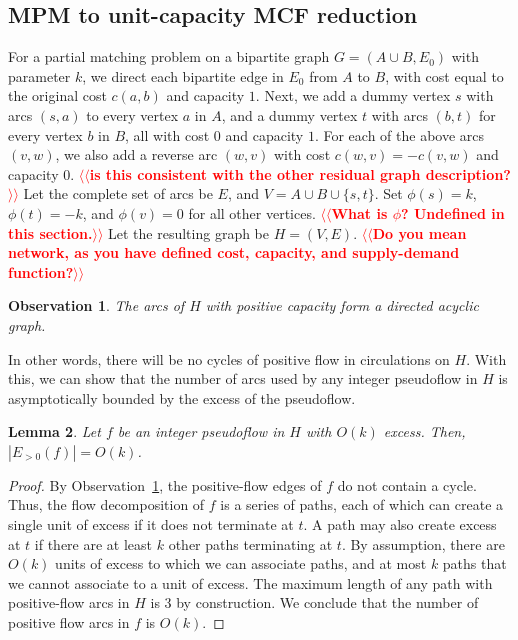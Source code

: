\documentclass[11pt]{article}
\makeatletter
\def\fsupply{\phi}
\theoremstyle{plain}
\newtheorem{lemma}{Lemma}[section]
\newtheorem{observation}[lemma]{Observation}
\numberwithin{figure}{section}
\def\n@te#1{\textsf{\boldmath \textbf{$\langle\!\langle$#1$\rangle\!\rangle$}}\leavevmode}
\def\note#1{\textcolor{red}{\n@te{#1}}}
\makeatother
\begin{document}
\subsection{MPM to unit-capacity MCF reduction}
\label{subsection:mcm_mcf_reduction}

For a partial matching problem on a bipartite graph $G = (A \cup B, E_0)$ with parameter $k$, we
direct each bipartite edge in $E_0$ from $A$ to $B$, with cost equal to the
original cost $c(a, b)$ and capacity $1$.
Next, we add a dummy vertex $s$ with arcs $(s, a)$ to every vertex $a$ in $A$,
and a dummy vertex $t$ with arcs $(b, t)$ for every vertex $b$ in $B$,
all with cost $0$ and capacity $1$.
For each of the above arcs $(v, w)$, we also add a reverse arc $(w, v)$ with
cost $c(w, v) = -c(v, w)$ and capacity $0$. \note{is this consistent with the other residual graph description?}
Let the complete set of arcs be $E$, and $V = A \cup B \cup \{s, t\}$.
Set $\fsupply(s) = k$, $\fsupply(t) = -k$, and $\fsupply(v) = 0$ for all other
vertices. \note{What is $\phi$?  Undefined in this section.}
Let the resulting graph be $H = (V, E)$. \note{Do you mean network, as you have defined cost, capacity, and supply-demand function?}

\begin{observation}
\label{observation:dag}
	The arcs of $H$ with positive capacity form a directed acyclic graph.
\end{observation}

In other words, there will be no cycles of positive flow in circulations on
$H$.
With this, we can show that the number of arcs used by any integer pseudoflow
in $H$ is asymptotically bounded by the excess of the pseudoflow.

\begin{lemma}
\label{lemma:reduction_count}
Let $f$ be an integer pseudoflow in $H$ with $O(k)$ excess.
Then, $|E_{>0}(f)| = O(k)$.
\end{lemma}

\begin{proof}
By Observation~\ref{observation:dag}, the positive-flow edges of $f$ do not
contain a cycle.
Thus, the flow decomposition of $f$ is a series of paths, each of which can
create a single unit of excess if it does not terminate at $t$.
A path may also create excess at $t$ if there are at least $k$ other paths
terminating at $t$.
By assumption, there are $O(k)$ units of excess to which we can associate
paths, and at most $k$ paths that we cannot associate to a unit of excess.
The maximum length of any path with positive-flow arcs in $H$ is $3$ by
construction.
We conclude that the number of positive flow arcs in $f$ is $O(k)$.
\end{proof}
\end{document}
